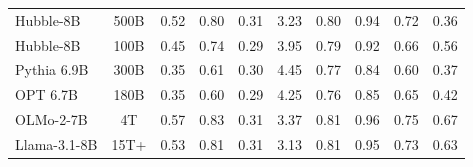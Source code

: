\documentclass{article} %
\begin{document}
\begin{table}[h]
\begin{tabular}{lccccccccc}
{Hubble-8B} & %
  {500B} &
  {0.52} &
  {0.80} &
  {0.31} &
  {3.23} &
  {0.80} &
  {0.94} &
  {0.72} &
  {0.36} \\
{Hubble-8B} & %
  {100B} &
  {0.45} &
  {0.74} &
  {0.29} &
  {3.95} &
  {0.79} &
  {0.92} &
  {0.66} &
  {0.56} \\
{Pythia 6.9B} &
  {300B} &
  {0.35} &
  {0.61} &
  {0.30} &
  {4.45} &
  {0.77} &
  {0.84} &
  {0.60} &
  {0.37} \\
{OPT 6.7B} &
  {180B} &
  {0.35} &
  {0.60} &
  {0.29} &
  {4.25} &
  {0.76} &
  {0.85} &
  {0.65} &
  {0.42} \\
{OLMo-2-7B} &
  {4T} &
  {0.57} &
  {0.83} &
  {0.31} &
  {3.37} &
  {0.81} &
  {0.96} &
  {0.75} &
  {0.67} \\
{Llama-3.1-8B} &
  {15T+} &
  {0.53} &
  {0.81} &
  {0.31} &
  {3.13} &
  {0.81} &
  {0.95} &
  {0.73} &
  {0.63} \\
\bottomrule
\end{tabular}
\end{table}
\end{document}
